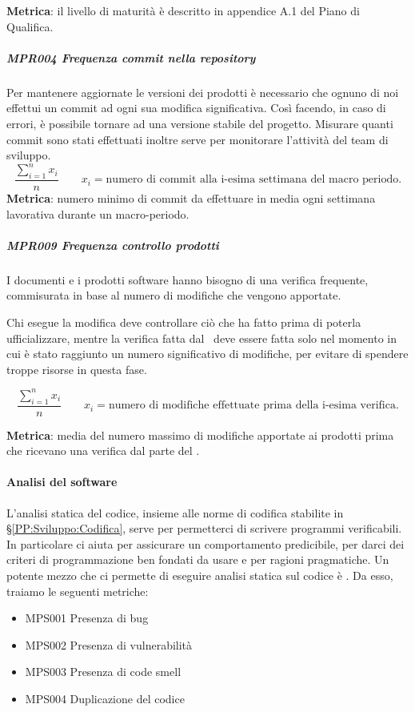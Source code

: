 	        \textbf{Metrica}: il livello di maturità è descritto in appendice A.1 del Piano di Qualifica.
		
			\subparagraph{MPR004 Frequenza commit nella repository}
			Per mantenere aggiornate le versioni dei prodotti è necessario che ognuno di noi effettui un commit ad ogni sua modifica significativa.
			Così facendo, in caso di errori, è possibile tornare ad una versione stabile del progetto.
			Misurare quanti commit sono stati effettuati inoltre serve per monitorare l'attività del team di sviluppo.
			\[\dfrac{\sum_{i=1}^{n} x_i}{n} \qquad x_i=\text{numero di commit alla i-esima settimana del macro periodo.}\]
			\textbf{Metrica}: numero minimo di commit da effettuare in media ogni settimana lavorativa durante un macro-periodo.


			\subparagraph{MPR009 Frequenza controllo prodotti}
			I documenti e i prodotti software hanno bisogno di una verifica frequente, commisurata in base al numero di modifiche che vengono apportate.
		
			Chi esegue la modifica deve controllare ciò che ha fatto prima di poterla ufficializzare, mentre la verifica fatta dal \Ver\ deve essere
			fatta solo nel momento in cui è stato raggiunto un numero significativo di modifiche, per evitare di spendere troppe risorse in questa fase.
		
			\[\dfrac{\sum_{i=1}^{n} x_i}{n} \qquad x_i=\text{numero di modifiche effettuate prima della i-esima verifica.}\]
		
			\textbf{Metrica}: media del numero massimo di modifiche apportate ai prodotti prima che ricevano una verifica dal parte del \Ver.


			\paragraph{Analisi del software} \label{analisisw}
			L'analisi statica del codice, insieme alle norme di codifica stabilite in \S\ref{PP:Sviluppo:Codifica}, serve per permetterci di scrivere programmi verificabili.
			In particolare ci aiuta per assicurare un comportamento predicibile, per darci dei criteri di programmazione ben fondati da usare e per ragioni pragmatiche.
			Un potente mezzo che ci permette di eseguire analisi statica sul codice è .
			Da esso, traiamo le seguenti metriche:
			\begin{itemize}%
				\item MPS001 Presenza di bug
				\item MPS002 Presenza di vulnerabilità
				\item MPS003 Presenza di code smell
				\item MPS004 Duplicazione del codice
			\end{itemize}
		
